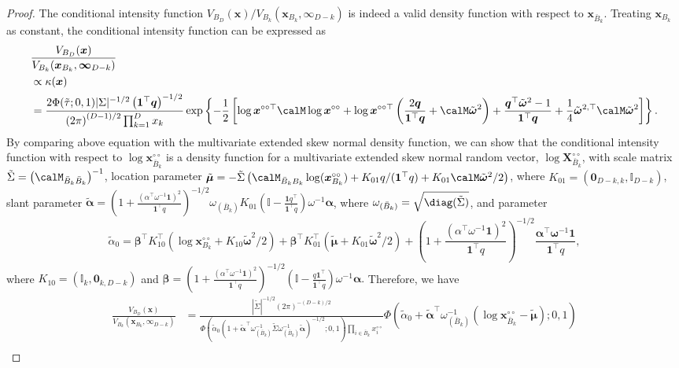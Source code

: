 \documentclass[12pt]{article}
\begin{document}
\begin{proof}
The conditional intensity function $V_{B_D}(\bm x)/V_{B_k}(\bm x_{B_k},\bm \infty_{D-k})$ is indeed a valid density function \citep{Wadsworth.Tawn:2013} with respect to $\bm x_{\bar B_k}$. Treating $\bm x_{B_k}$ as constant, the conditional intensity function can be expressed as 
\begin{align*}
    & \frac{V_{B_D}(\bm x)}{V_{B_k}(\bm x_{B_k},\bm \infty_{D-k})} \\
    & \propto \kappa(\bm x) \\
    & = \frac{2\Phi(\tilde{\tau};0,1)| \Sigma |^{-1/2} \left( \bm 1^\top \bm q\right)^{-1/2}}{\left( 2\pi \right)^{(D-1)/2}\prod_{k=1}^Dx_k}\exp \left\{ -\frac{1}{2} \left[ \log \bm x^{\circ\circ\top} \calM \log \bm x^{\circ\circ} + \log \bm x^{\circ\circ\top} \left( \frac{2 \bm q}{\bm 1^\top \bm q}+\calM\tilde{\bm\omega}^2\right) + \frac{\bm q^\top\tilde{\bm \omega}^2 - 1}{\bm 1 ^\top \bm q } + \frac{1}{4}\tilde{\bm\omega}^{2,\top}\calM\tilde{\bm\omega}^2 \right]\right\}.
\end{align*}    
 By comparing above equation with the multivariate extended skew normal density function, we can show that the conditional intensity function with respect to $\log\bm x_{\bar B_k}^{\circ\circ}$ is a density function for a multivariate  extended skew normal random vector, $\log\bm X_{\bar B_k}^{\circ\circ}$, with scale matrix $\tilde\Sigma = \left(\calM_{\bar B_k\bar B_k}\right)^{-1}$, location parameter $\tilde{\bm\mu} = -\tilde\Sigma\left(\calM_{\bar B_kB_k}\log(\bm x_{B_k}^{\circ\circ}) + K_{01}q/(\bm 1^\top q)+K_{01}\calM\tilde{\bm\omega}^2/2\right)$, where $K_{01} = (\bm 0_{D-k,k},\mathbb I_{D-k})$, slant parameter $\tilde{\bm\alpha}=\left(1 + \frac{\left(\alpha^\top\omega^{-1}\bm 1\right)^2}{\bm 1^\top q}\right)^{-1/2}\omega_{(\bar B_k)} K_{01}\left(\mathbb{I} - \frac{\bm 1 q^\top}{\bm 1^\top q}\right)\omega^{-1}\bm\alpha$, where $\omega_{(\bar B_k)}=\sqrt{\diag(\tilde\Sigma)}$, and parameter 
$$\tilde\alpha_0 = \bm\beta^\top K_{10}^\top(\log \bm x_{B_k}^{\circ\circ}+K_{10}\tilde{\bm\omega}^2/2) + \bm\beta^\top K_{01}^\top(\tilde{\bm\mu} + K_{01}\tilde{\bm\omega}^2/2) +  \left(1 + \frac{(\alpha^\top\omega^{-1}\bm 1)^2}{\bm 1^\top q}\right)^{-1/2}\frac{\bm\alpha^\top\bm\omega^{-1}\bm 1}{\bm 1^\top q},$$ 
where $K_{10} = (\mathbb I_{k},\bm 0_{k,D-k})$ and
$\bm\beta = \left(1 + \frac{(\alpha^\top\omega^{-1}\bm 1)^2}{\bm 1^\top q}\right)^{-1/2}\left(\mathbb I - \frac{q\bm 1^\top}{\bm 1^\top q}\right)\omega^{-1}\bm\alpha.$
Therefore, we have
\begin{align*}
\frac{V_{B_D}(\bm x)}{V_{B_k}(\bm x_{B_k},\bm \infty_{D-k})} &= \frac{|\tilde\Sigma|^{-1/2}(2\pi)^{-(D-k)/2}}{\Phi\left(\tilde\alpha_0\left(1+\tilde{\bm\alpha}^\top\omega_{(\bar B_k)}^{-1}\tilde\Sigma\omega_{(\bar B_k)}^{-1}\tilde{\bm\alpha}\right)^{-1/2};0,1\right) \prod_{i\in\bar B_k}x_i^{\circ\circ}} \Phi\left(\tilde\alpha_0 + \tilde{\bm\alpha}^\top\omega_{(\bar B_k)}^{-1}\left(\log \bm x_{\bar B_k}^{\circ\circ} - \tilde{\bm\mu}\right);0,1\right) \\

\end{align*}
\end{proof}
\end{document}
